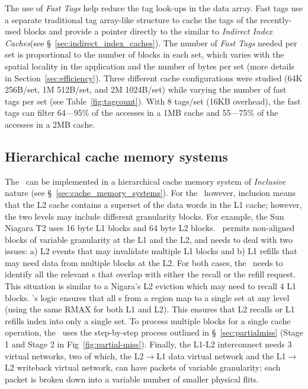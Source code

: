 The use of \textit{Fast Tags} help reduce the tag look-ups in the data array. Fast tags use a separate traditional tag array-like structure to cache the tags of the recently-used blocks and provide a pointer directly to the \AB{} similar to \textit{Indirect Index Caches}(see \S~\ref{sec:indirect_index_caches}). The number of \textit{Fast Tags} needed per set is proportional to the number of blocks in each set, which varies with the spatial locality in the application and the number of bytes per set (more details in Section~\ref{sec:efficiency}). Three different cache configurations were studied (64K 256B/set, 1M 512B/set, and 2M 1024B/set) while varying the number of fast tags per set (see Table~\ref{fig:tagcount}). With 8 tags/set (16KB overhead), the fast tags can filter 64---95\% of the accesses in a 1MB cache and 55---75\% of the accesses in a 2MB cache.

\subsection{Hierarchical cache memory systems}
\label{sec:multicache}

The \AC\ can be implemented in a hierarchical cache memory system of \textit{Inclusive} nature (see \S~\ref{sec:cache_memory_systems}). For the \AC\ however, inclusion means that the L2 cache contains a superset of the data words in the L1 cache; however, the two levels may include different granularity blocks. For example, the Sun Niagara T2 uses 16 byte L1 blocks and 64 byte L2 blocks. \AC\ permits non-aligned blocks of variable granularity at the L1 and the L2, and needs to deal with two issues: a) L2 events that may invalidate multiple L1 blocks and b) L1 refills that may need data from multiple blocks at the L2. For both cases, the \AC\ needs to identify all the relevant \AB{}s that overlap with either the recall or the refill request. This situation is similar to a Nigara's L2 eviction which may need to recall 4 L1 blocks. \AC{}'s logic ensures that all \AB{}s from a region map to a single set at any level (using the same RMAX for both L1 and L2). This ensures that L2 recalls or L1 refills index into only a single set. To process multiple blocks for a single cache operation, the \AC\ uses the step-by-step process outlined in \S~\ref{sec:partialmiss} (Stage 1 and Stage 2 in Fig~\ref{fig:partial-miss}). Finally, the L1-L2 interconnect needs 3 virtual networks, two of which, the L2$\rightarrow$L1 data virtual network and the L1$\rightarrow$L2 writeback virtual network, can have packets of variable granularity; each packet is broken down into a variable number of smaller physical flits.

